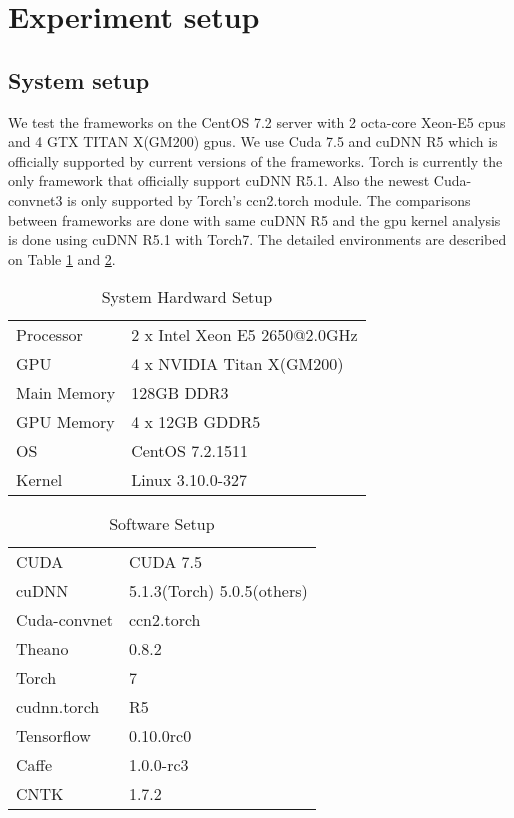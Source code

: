 \section{Experiment setup}

\subsection{System setup}
We test the frameworks on the CentOS 7.2 server with 2 octa-core Xeon-E5 cpus and 4 GTX TITAN X(GM200) gpus.
We use Cuda 7.5 and cuDNN R5 which is officially supported by current versions of the frameworks.
Torch is currently the only framework that officially support cuDNN R5.1.
Also the newest Cuda-convnet3 is only supported by Torch's ccn2.torch module.
The comparisons between frameworks are done with same cuDNN R5 and the gpu kernel analysis is done using cuDNN R5.1 with Torch7.
The detailed environments are described on Table \ref{table_system} and \ref{table_software}.

\begin{table}[]
\centering
\caption{System Hardward Setup}
\label{table_system}
\begin{tabular}{ll}
Processor   & 2 x Intel Xeon E5 2650@2.0GHz \\
GPU         & 4 x NVIDIA Titan X(GM200)     \\
Main Memory & 128GB DDR3                    \\
GPU Memory  & 4 x 12GB GDDR5                \\
OS          & CentOS 7.2.1511               \\
Kernel      & Linux 3.10.0-327             
\end{tabular}
\end{table}

\begin{table}[]
\centering
\caption{Software Setup}
\label{table_software}
\begin{tabular}{ll}
CUDA 		& CUDA 7.5 \\
cuDNN		& 5.1.3(Torch) \/ 5.0.5(others)     \\
Cuda-convnet& ccn2.torch			\\
Theano		& 0.8.2                    \\
Torch		& 7                \\
cudnn.torch	& R5		\\
Tensorflow	& 0.10.0rc0     	\\
Caffe		& 1.0.0-rc3			\\
CNTK		& 1.7.2             
\end{tabular}
\end{table}

